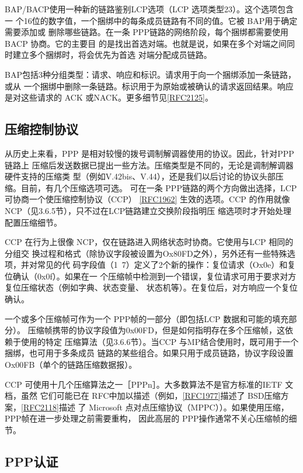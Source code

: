 BAP/BACP使用一种新的链路鉴别LCP选项（LCP 选项类型23）。这个选项包含一
个16位的数字值，一个捆绑中的每条成员链路有不同的值。它被 BAP用于确定需要添加或
删除哪些链路。在一条 PPP链路的网络阶段，每个捆绑都需要使用BACP 协商。它的主要目
的是找出首选对端。也就是说，如果在多个对端之间同时建立多个捆绑时，将会优先为首选
对端分配成员链路。

BAP包括3种分组类型：请求、响应和标识。请求用于向一个捆绑添加一条链路，或从
一个捆绑中删除一条链路。标识用于为原始或被确认的请求返回结果。响应是对这些请求的
ACK 或NACK。更多细节见\href{https://www.rfc-editor.org/rfc/rfc2125}{[RFC2125]}。

\subsection{压缩控制协议}

从历史上来看，PPP 是相对较慢的拨号调制解调器使用的协议。因此，针对PPP链路上
压缩后发送数据已提出一些方法。压缩类型是不同的，无论是调制解调器硬件支持的压缩类
型（例如V.42bis、V.44），还是我们以后讨论的协议头部压缩。目前，有几个压缩选项可选。
可在一条 PPP链路的两个方向做出选择，LCP 可协商一个使压缩控制协议（CCP）
\href{https://www.rfc-editor.org/rfc/rfc1962}{[RFC1962]}
生效的选项。CCP 的作用就像 NCP（见3.6.5节），只不过在LCP链路建立交换阶段指明压
缩选项时才开始处理配置压缩细节。

CCP 在行为上很像 NCP，仅在链路进入网络状态时协商。它使用与LCP 相同的分组交
换过程和格式（除协议字段被设置为Ox80FD之外），另外还有一些特殊选项，并对常见的代
码字段值（1~7）定义了2个新的操作：复位请求（Ox0e）和复位确认（0x0f）。如果在一
个压缩帧中检测到一个错误，复位请求可用于要求对方复位压缩状态（例如字典、状态变量、
状态机等）。在复位后，对方响应一个复位确认。

一个或多个压缩帧可作为一个 PPP帧的一部分（即包括LCP 数据和可能的填充部分）。
压缩帧携带的协议字段值为0x00FD，但是如何指明存在多个压缩帧，这依赖于使用的特定
压缩算法（见3.6.6节）。当CCP 与MP结合使用时，既可用于一个捆绑，也可用于多条成员
链路的某些组合。如果只用于成员链路，协议字段设置 Ox00FB（单个的链路压缩数据报）。

CCP 可使用十几个压缩算法之一［PPPn］。大多数算法不是官方标准的IETF 文档，虽然
它们可能已在
RFC中加以描述（例如，\href{https://www.rfc-editor.org/rfc/rfc1977}{[RFC1977]}描述了
BSD压缩方案，\href{https://www.rfc-editor.org/rfc/rfc2118}{[RFC2118]}描述
了 Microsoft 点对点压缩协议（MPPC））。如果使用压缩，PPP帧在进一步处理之前需要重构，
因此高层的 PPP操作通常不关心压缩帧的细节。

\subsection{PPP认证}

